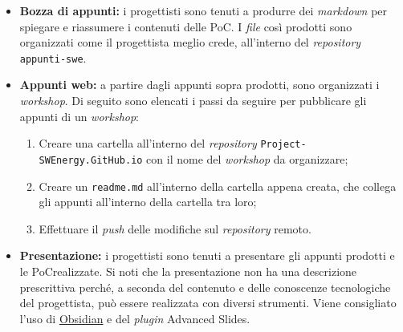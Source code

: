 \begin{itemize}
	\item \textbf{Bozza di appunti:} i progettisti sono tenuti a produrre dei
	      \textit{markdown} per spiegare e riassumere i contenuti delle PoC\g. I
	      \textit{file} così prodotti sono organizzati come il progettista
	      meglio crede, all'interno del \textit{repository\g}
	      \texttt{appunti-swe}.

	\item \textbf{Appunti web:} a partire dagli appunti sopra prodotti, sono
	      organizzati i \textit{workshop}. Di seguito sono elencati i passi da
	      seguire per pubblicare gli appunti di un \textit{workshop}:
	      \begin{enumerate}
		      \item Creare una cartella all'interno del \textit{repository\g}
		            \texttt{Project-SWEnergy.GitHub.io} con il nome del
		            \textit{workshop} da organizzare;

		      \item Creare un \texttt{readme.md} all'interno della
		            cartella appena creata, che collega gli appunti all'interno
		            della cartella tra loro;

		      \item Effettuare il \textit{push} delle modifiche sul
		            \textit{repository\g} remoto.
	      \end{enumerate}

	\item \textbf{Presentazione:} i progettisti sono tenuti a presentare gli
	      appunti prodotti e le PoC\g realizzate.
	      Si noti che la presentazione non ha una descrizione prescrittiva
	      perché, a seconda del contenuto e delle conoscenze tecnologiche del
	      progettista, può essere realizzata con diversi strumenti. Viene
	      consigliato l'uso di \href{https://obsidian.md/}{Obsidian} e
	      del \textit{plugin} Advanced Slides.
\end{itemize}
